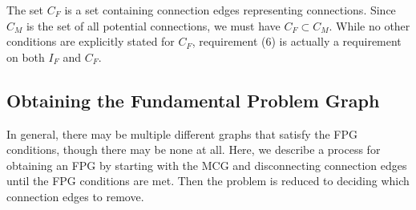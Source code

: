 The set $C_F$ is a set containing connection edges representing connections. Since $C_M$ is the set of all potential connections, we must have $C_F \subset C_M$. While no other conditions are explicitly stated for $C_F$, requirement (6) is actually a requirement on both $I_F$ and $C_F$.

\subsection{Obtaining the Fundamental Problem Graph}
In general, there may be multiple different graphs that satisfy the FPG conditions, though there may be none at all. Here, we describe a process for obtaining an FPG by starting with the MCG and disconnecting connection edges until the FPG conditions are met. Then the problem is reduced to deciding which connection edges to remove.

